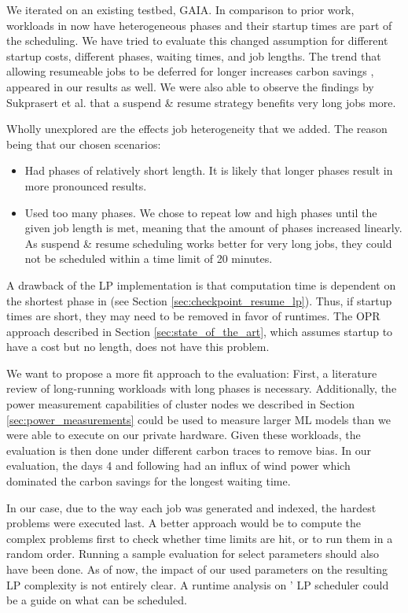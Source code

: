 We iterated on an existing testbed, GAIA.
In comparison to prior work, workloads in \programname{} now have heterogeneous phases and their startup times are part of the scheduling.
We have tried to evaluate this changed assumption for different startup costs, different phases, waiting times, and job lengths. 
The trend that allowing resumeable jobs to be deferred for longer increases carbon savings \cite{wiesner_lets_2021,hanafy_going_2024, hanafy_war_2023}, appeared in our results as well. 
We were also able to observe the findings by Sukprasert et al. \cite{sukprasert_limitations_2024} that a suspend \& resume strategy benefits very long jobs more.

Wholly unexplored are the effects job heterogeneity that we added.
The reason being that our chosen scenarios:

\begin{itemize}
    \item Had phases of relatively short length. It is likely that longer phases result in more pronounced results.
    \item Used too many phases. We chose to repeat low and high phases until the given job length is met, meaning that the amount of phases increased linearly. As suspend \& resume scheduling works better for very long jobs, they could not be scheduled within a time limit of 20 minutes.
\end{itemize}

A drawback of the LP implementation is that computation time is dependent on the shortest phase in \modelname{} (see Section \ref{sec:checkpoint_resume_lp}). Thus, if startup times are short, they may need to be removed in favor of runtimes. The OPR approach described in Section \ref{sec:state_of_the_art}, which assumes startup to have a cost but no length, does not have this problem.

We want to propose a more fit approach to the evaluation:
First, a literature review of long-running workloads with long phases is necessary. Additionally, the power measurement capabilities of cluster nodes we described in Section \ref{sec:power_measurements} could be used to measure larger ML models than we were able to execute on our private hardware.
Given these workloads, the evaluation is then done under different carbon traces to remove bias.
In our evaluation, the days 4 and following had an influx of wind power which dominated the carbon savings for the longest waiting time. 

In our case, due to the way each job was generated and indexed, the hardest problems were executed last. 
A better approach would be to compute the complex problems first to check whether time limits are hit, or to run them in a random order.
Running a sample evaluation for select parameters should also have been done.
As of now, the impact of our used parameters on the resulting LP complexity is not entirely clear.
A runtime analysis on \programname{}' LP scheduler could be a guide on what can be scheduled.

